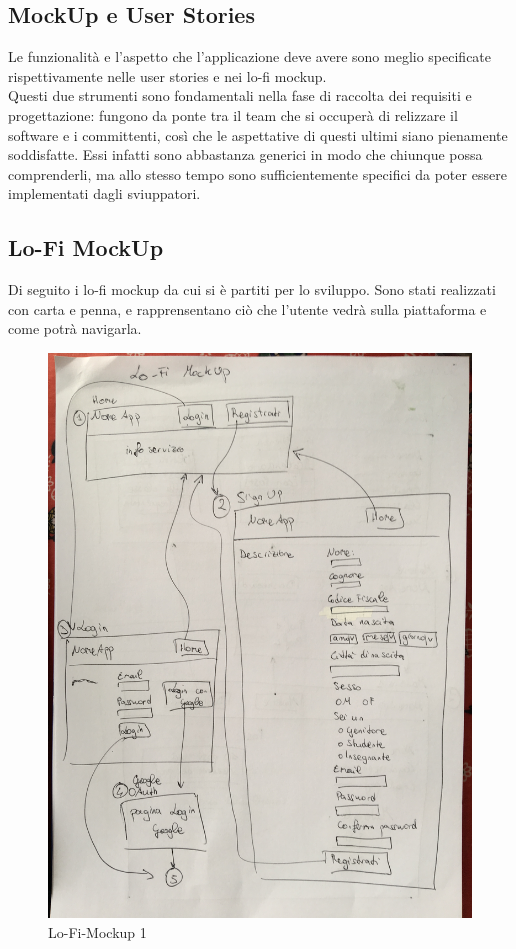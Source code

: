 \documentclass[Lau, binding=0.6cm, oneside]{sapthesis}
\begin{document}
\subsection{MockUp e User Stories}

Le funzionalità e l'aspetto che l'applicazione deve avere sono meglio specificate rispettivamente nelle user stories e nei lo-fi mockup.\\
Questi due strumenti sono fondamentali nella fase di raccolta dei requisiti e progettazione: fungono da ponte tra il team che si occuperà di relizzare il software e i committenti, così che le aspettative di questi ultimi siano pienamente soddisfatte. Essi infatti sono abbastanza generici in modo che chiunque possa comprenderli, ma allo stesso tempo sono sufficientemente specifici da poter essere implementati dagli sviuppatori.

\newpage
\subsection{Lo-Fi MockUp}

Di seguito i lo-fi mockup da cui si è partiti per lo sviluppo. Sono stati realizzati con carta e penna, e rapprensentano ciò che l'utente vedrà sulla piattaforma e come potrà navigarla.\\

\begin{figure}[H]
	\centering
	\includegraphics[width=1.3\linewidth, angle=-90]{images/mockup_1}
	\caption{Lo-Fi-Mockup 1}
	\label{fig:mockup_1}
\end{figure}
\end{document}
